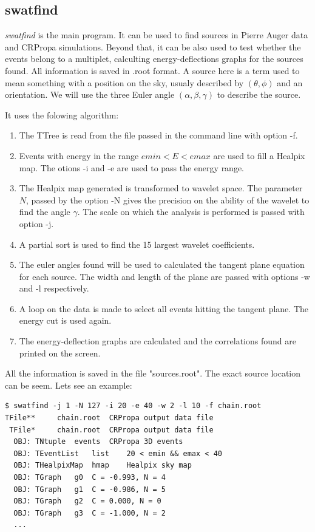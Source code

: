 \documentclass[12pt]{article}
\begin{document}
\subsection{swatfind}
{\it swatfind} is the main program. It can be used to find sources in Pierre
Auger data and CRPropa simulations. Beyond that, it can be also used to test
whether the events belong to a multiplet, calculting energy-deflections graphs
for the sources found. All information is saved in .root format. A source here
is a term used to mean something with a position on the sky, usualy described
by $(\theta,\phi)$ and an orientation. We will use the three Euler angle
$(\alpha,\beta,\gamma)$ to describe the source. 

It uses the folowing algorithm:
\begin{enumerate}
\item The TTree is read from the file passed in the command line with option
-f.
\item Events with energy in the range $emin < E < emax$ are used to fill a
Healpix map.  The otions -i and -e are used to pass the energy range.
\item The Healpix map generated is transformed to wavelet space. The parameter
$N$, passed by the option -N gives the precision on the ability of the wavelet
to find the angle $\gamma$. The scale on which the analysis is performed is
passed with option -j. 
\item A partial sort is used to find the 15 largest wavelet coefficients.
\item The euler angles found will be used to calculated the tangent plane
equation for each source. The width and length of the plane are passed with
options -w and -l respectively.
\item A loop on the data is made to select all events hitting the tangent
plane. The energy cut is used again.
\item The energy-deflection graphs are calculated and the correlations found
are printed on the screen.
\end{enumerate}
All the information is saved in the file {\color{brown}"sources.root"}. The exact
source location can be seem. Lets see an example:

{\bf \color{brown}
\begin{lstlisting}
$ swatfind -j 1 -N 127 -i 20 -e 40 -w 2 -l 10 -f chain.root
TFile**		chain.root	CRPropa output data file
 TFile*		chain.root	CRPropa output data file
  OBJ: TNtuple	events	CRPropa 3D events
  OBJ: TEventList	list	20 < emin && emax < 40 
  OBJ: THealpixMap	hmap	Healpix sky map
  OBJ: TGraph	g0	C = -0.993, N = 4 
  OBJ: TGraph	g1	C = -0.986, N = 5
  OBJ: TGraph	g2	C = 0.000, N = 0
  OBJ: TGraph	g3	C = -1.000, N = 2
  ...
\end{lstlisting}
}
\end{document}
